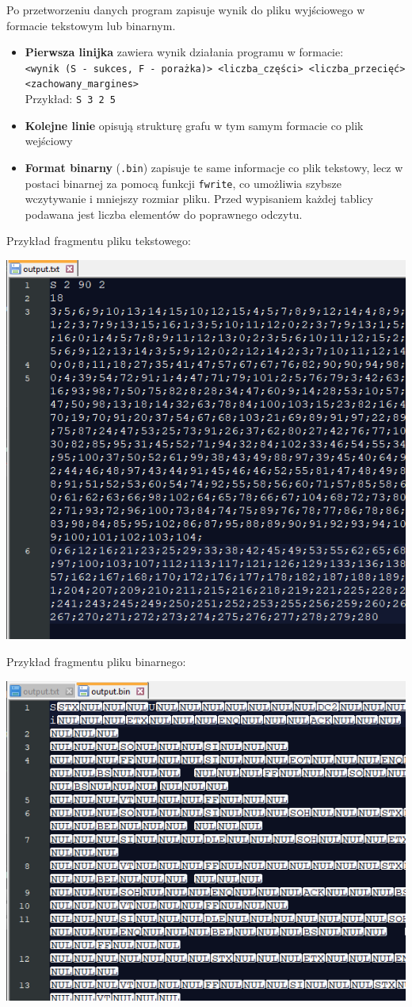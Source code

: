 \documentclass{article}
\begin{document}
        Po przetworzeniu danych program zapisuje wynik do pliku wyjściowego w formacie tekstowym lub binarnym.
        \begin{itemize}
            \item \textbf{Pierwsza linijka} zawiera wynik działania programu w formacie: \\
            \texttt{<wynik (S - sukces, F - porażka)> <liczba\_części> <liczba\_przecięć> <zachowany\_margines>} \\
            Przykład: \texttt{S 3 2 5}
            \item \textbf{Kolejne linie} opisują strukturę grafu w tym samym formacie co plik wejściowy
            \item \textbf{Format binarny} (\texttt{.bin}) zapisuje te same informacje co plik tekstowy, lecz w postaci binarnej za pomocą funkcji \texttt{fwrite}, co umożliwia szybsze wczytywanie i mniejszy rozmiar pliku. Przed wypisaniem każdej tablicy podawana jest liczba elementów do poprawnego odczytu.
        \end{itemize}
        Przykład fragmentu pliku tekstowego:
        \begin{center}
            \includegraphics[width=0.8\linewidth]{img/outputtxt.png}
        \end{center}
        Przykład fragmentu pliku binarnego:
        \begin{center}
            \includegraphics[width=0.8\linewidth]{img/outputbin.png}
        \end{center}
\end{document}

